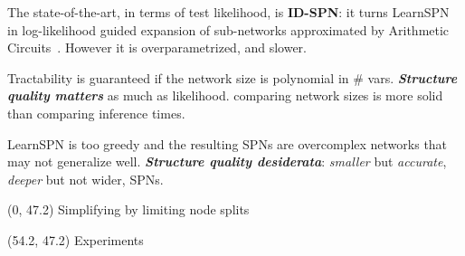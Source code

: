 \documentclass[final]{beamer}
\begin{document}
\begin{frame}{}
\begin{textblock}{25.7}

    The state-of-the-art, in terms of test likelihood, is \textbf{ID-SPN}: it turns LearnSPN in log-likelihood guided expansion of sub-networks
    approximated by Arithmetic
    Circuits~\emph{\parencite{Rooshenas2014}}. However it is
    overparametrized, and slower.\par\bigskip
    
    
    Tractability is guaranteed if the network size is polynomial in \#
    vars. \emph{\textbf{Structure quality matters}} as much as likelihood. comparing network sizes is more solid than comparing inference times.\par\bigskip

    LearnSPN is too greedy and the resulting SPNs are overcomplex
    networks that may not generalize well. \textbf{\emph{Structure quality desiderata}}: \emph{smaller} but \emph{accurate}, \emph{deeper} but not wider, SPNs. 

  \end{textblock}
  
  
  \begin{textblock}{80}(0, 47.2)
    Simplifying by limiting node splits
  \end{textblock}

  \begin{textblock}{20}(54.2, 47.2)
    Experiments
  \end{textblock}
  

\end{frame}
\end{document}
